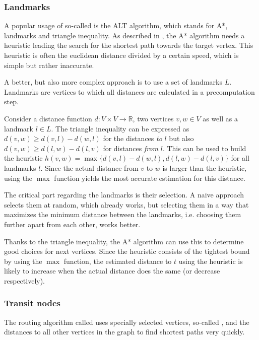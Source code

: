 		\subsubsection{Landmarks}
		
			A popular usage of so-called  is the ALT algorithm, which stands for A*, landmarks and triangle inequality\cite{goldberg-landmarks}.
			As described in , the A* algorithm needs a heuristic leading the search for the shortest path towards the target vertex.
			This heuristic is often the euclidean distance divided by a certain speed, which is simple but rather inaccurate.
			
			A better, but also more complex approach is to use a set of landmarks $L$.
			Landmarks are vertices to which all distances are calculated in a precomputation step.
			
			Consider a distance function $d : V \times V \rightarrow \mathbb{R}$, two vertices $v, w \in V$ as well as a landmark $l \in L$.
			The triangle inequality can be expressed as $d(v,w) \geq d(v,l) - d(w,l)$ for the distances \emph{to} $l$ but also $d(v,w) \geq d(l,w) - d(l,v)$ for distances \emph{from} $l$.
			This can be used to build the heuristic $h(v, w) = \max \{ d(v,l)-d(w,l), d(l,w)-d(l,v) \}$ for all landmarks $l$.
			Since the actual distance from $v$ to $w$ is larger than the heuristic, using the $\max$ function yields the most accurate estimation for this distance.
			
			The critical part regarding the landmarks is their selection.
			A naive approach selects them at random, which already works, but selecting them in a way that maximizes the minimum distance between the landmarks, i.e. choosing them further apart from each other, works better.
			
			Thanks to the triangle inequality, the A* algorithm can use this to determine good choices for next vertices.
			Since the heuristic consists of the tightest bound by using the $\max$ function, the estimated distance to $t$ using the heuristic is likely to increase when the actual distance does the same (or decrease respectively).
		
		\subsubsection{Transit nodes}
		\label{subsubsec:transit}
		
			The routing algorithm called  uses specially selected vertices, so-called , and the distances to all other vertices in the graph to find shortest paths very quickly\cite{bast-transit}.
		
